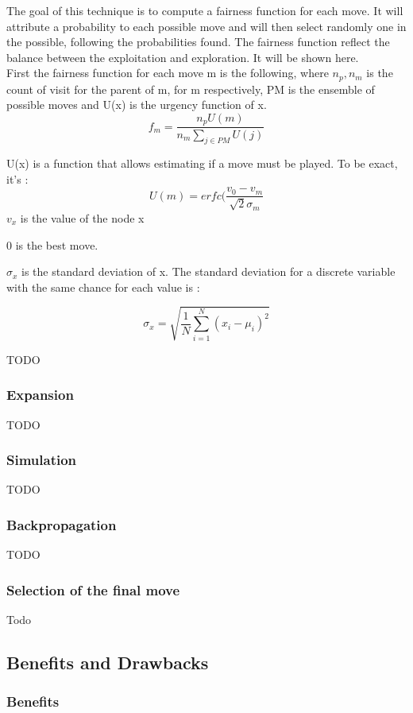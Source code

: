 The goal of this technique is to compute a fairness function for each move. It will attribute a probability to each possible move and will then select randomly one in the possible, following the probabilities found. The fairness function reflect the balance between the exploitation and exploration. It will be shown here. 
\\

First the fairness function for each move m is the following, where $n_p, n_m$ is the count of visit for the parent of m, for m respectively, PM is the ensemble of possible moves and U(x) is the urgency function of x. 
$$
f_m = \frac{n_p U(m)}{n_m \sum\nolimits_{j \in PM} U(j)}
$$

U(x) is a function that allows estimating if a move must be played. To be exact, it's : 
$$
U(m) = erfc(\frac{v_0 -v_m}{\sqrt{2}\sigma_m}
$$
$v_x$ is the value of the node x

0 is the best move. 

$\sigma_x$ is the standard deviation of x. The standard deviation for a discrete variable with the same chance for each value is : 

$$ 
\sigma_x 	= \sqrt{\frac{1}{N} \sum\limits_{i=1}^{N} (x_i-\mu_i)^2}
$$

TODO

\subsubsection{Expansion}
TODO
\subsubsection{Simulation}
TODO
\subsubsection{Backpropagation}
TODO

\subsubsection{Selection of the final move}
Todo

\subsection{Benefits and Drawbacks}

\subsubsection{Benefits}

